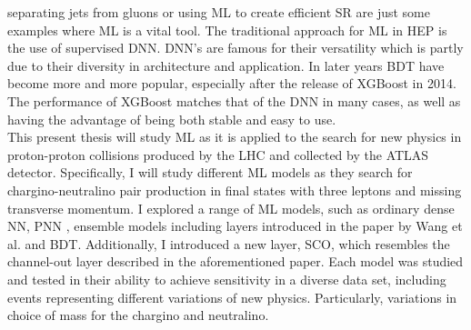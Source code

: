 separating jets from gluons \cite{PhysRevD.44.2025} or using \ac{ML} to create efficient \ac{SR} \cite{baldi_searching_2014} are just some examples
where \ac{ML} is a vital tool. The traditional approach for \ac{ML} in \ac{HEP} is the use of supervised
\ac{DNN}. \ac{DNN}'s are famous for their versatility which is partly due to their diversity in architecture and 
application. In later years \ac{BDT} have become more and more popular, especially after the release of XGBoost \cite{XGB}
in 2014. The performance of XGBoost matches that of the \ac{DNN} in many cases, as well as having the advantage 
of being both stable and easy to use. \newline
\\
This present thesis will study \ac{ML} as it is applied to the search for new physics in proton-proton collisions produced by the \ac{LHC} and collected by 
the \acs{ATLAS} detector. Specifically, I will study different \ac{ML} models as they search for chargino-neutralino pair production in final states 
with three leptons and missing transverse momentum. I explored a range of \ac{ML} models, such as ordinary dense \acl{NN}, \acl{PNN} \cite{PNN},
ensemble models including layers introduced in the paper by Wang et al. \cite{wang_maxout_2013} and \acl{BDT}. Additionally, I introduced a new layer, \acl{SCO}, which 
resembles the channel-out layer described in the aforementioned paper. Each model was studied and tested in their ability to achieve sensitivity in a diverse 
data set, including events representing different variations of new physics. Particularly, variations in choice of mass for the chargino and neutralino.
